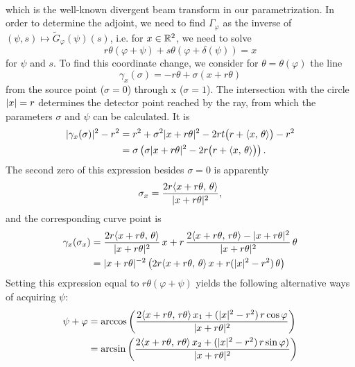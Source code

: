 \documentclass{amsart}
\renewcommand*{\phi}{\varphi}
\begin{document}
\begin{example}
\begin{align*}
 \end{align*}
 which is the well-known divergent beam transform in our parametrization. In order to determine the adjoint, we need to find
 $\Gamma_\phi$ as the inverse of $(\psi, s) \mapsto \tilde G_\phi(\psi)(s)$, i.e. for $x \in {\ensuremath{\mathbb{R}}}^2$, we need to solve
 \begin{equation*}
  r\theta(\phi + \psi) + s\theta(\phi + \delta(\psi)) = x
 \end{equation*}
 for $\psi$ and $s$. To find this coordinate change, we consider for $\theta=\theta(\phi)$ the line
 \begin{equation*}
  \gamma_x(\sigma) = -r\theta + \sigma(x+r\theta)
 \end{equation*}
 from the source point ($\sigma=0$) through x ($\sigma=1$). The intersection with the circle $|x|=r$ determines the detector point 
reached by the 
 ray, from which the parameters $\sigma$ and $\psi$ can be calculated. It is
 \begin{align*}
  |\gamma_x(\sigma)|^2 - r^2 
  &= r^2 + \sigma^2 |x + r\theta|^2 -2rt \big(r + \langle x,\,\theta\rangle\big) - r^2 \\
  &= \sigma \left(\sigma |x + r\theta|^2 -2r \big(r + \langle x,\,\theta\rangle\big)\right).
 \end{align*}
 The second zero of this expression besides $\sigma=0$ is apparently
 \begin{equation}
  \sigma_x = \frac{2r \langle x + r\theta,\,\theta\rangle}{|x + r\theta|^2},
 \end{equation} 
 and the corresponding curve point is
 \begin{align*}
  \gamma_x(\sigma_x) &= \frac{2r \langle x + r\theta,\,\theta\rangle}{|x + r\theta|^2}\, x + 
  r\, \frac{2 \langle x + r\theta,\,r\theta\rangle - |x + r\theta|^2}{|x + r\theta|^2}\, \theta \\
  &= |x + r\theta|^{-2} \left(2r \langle x + r\theta,\,\theta\rangle\, x + r(|x|^2 - r^2)\, \theta \right)
 \end{align*}
 Setting this expression equal to $r\theta(\phi + \psi)$ yields the following alternative ways of acquiring $\psi$:
 \begin{align}
  \psi + \phi
  \label{eq:fanbeam_psi_1}
  &= \arccos\left(\frac{2 \INNER{x + r\theta}{r\theta}\, x_1 + (\ABS{x}^2 - r^2)\, r\cos\phi}{\ABS{x + r\theta}^2} \right) \\
  \label{eq:fanbeam_psi_2}
  &= \arcsin\left(\frac{2 \INNER{x + r\theta}{r\theta}\, x_2 + (\ABS{x}^2 - r^2)\, r\sin\phi)}{\ABS{x + r\theta}^2} \right) \\

\end{align}
\end{example}
\end{document}
